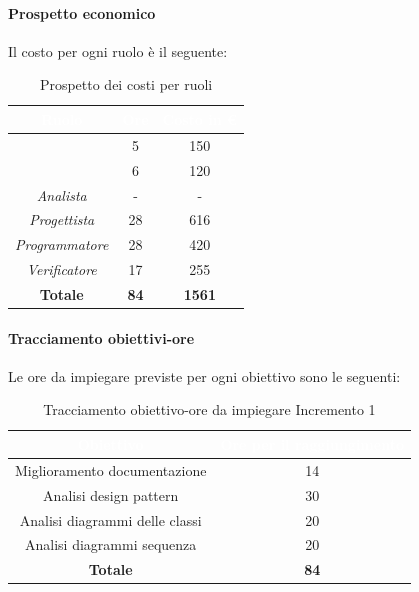 \paragraph*{Prospetto economico}
Il costo per ogni ruolo è il seguente:
\begin{table}[H]
	\begin{center}
		\begin{tabular}{ |c c c| }
			\rowcolor{darkblue} 
			\textcolor{white}{\textbf{Ruolo}} & \textcolor{white}{\textbf{Ore}} & \textcolor{white}{\textbf{Costo in €}}\\ \hline
		{\Responsabile} 			& 5 	& 150 \\ \hline
		{\Amministratore}		 	& 6 	& 120 \\ \hline
		\textit{Analista} 			& - 	& - \\ \hline
		\textit{Progettista} 		& 28 	& 616 \\ \hline
		\textit{Programmatore}  	& 28 	& 420 \\ \hline
		\textit{Verificatore} 		& 17 	& 255 \\ \hline
		\textbf{Totale} & \textbf{84} & \textbf{1561} \\ \hline
		\end{tabular}
		\caption{Prospetto dei costi per ruoli}
	\end{center}
\end{table}
\paragraph*{Tracciamento obiettivi-ore}
Le ore da impiegare previste per ogni obiettivo sono le seguenti:
\begin{table}[H]
	\begin{center}
		\begin{tabular}{ |c c| }
			\rowcolor{darkblue} 
			\textcolor{white}{\textbf{Obiettivo}}	& \textcolor{white}{\textbf{Ore per il raggiungimento}} \\ \hline
			{Miglioramento documentazione} 			& 14 	\\ \hline
			{Analisi design pattern} 				& 30 	\\ \hline
			{Analisi diagrammi delle classi} 		& 20 	\\ \hline
			{Analisi diagrammi sequenza} 			& 20 	\\ \hline
			\textbf{Totale} 						& \textbf{84}  \\ \hline
		\end{tabular}
		\caption{Tracciamento obiettivo-ore da impiegare Incremento 1}
	\end{center}
\end{table}
